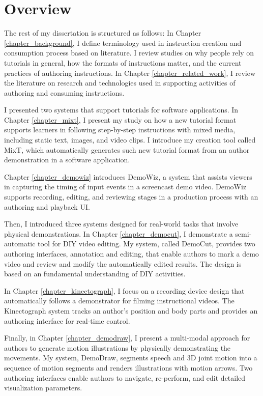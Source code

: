 
\section{Overview}

The rest of my dissertation is structured as follows:
%
In Chapter \ref{chapter_background}, I define terminology used in instruction creation and consumption process based on literature. I review studies on why people rely on tutorials in general, how the formats of instructions matter, and the current practices of authoring instructions.
%
In Chapter \ref{chapter_related_work}, I review the literature on research and technologies used in supporting activities of authoring and consuming instructions.

I presented two systems that support tutorials for software applications.
In Chapter \ref{chapter_mixt}, I present my study on how a new tutorial format supports learners in following step-by-step instructions with mixed media, including static text, images, and video clips. I introduce my creation tool called MixT, which automatically generates such new tutorial format from an author demonstration in a software application.

Chapter \ref{chapter_demowiz} introduces DemoWiz, a system that assists viewers in capturing the timing of input events in a screencast demo video. DemoWiz supports recording, editing, and reviewing stages in a production process with an authoring and playback UI.

Then, I introduced three systems designed for real-world tasks that involve physical demonstrations.
In Chapter \ref{chapter_democut}, I demonstrate a semi-automatic tool for DIY video editing. My system, called DemoCut, provides two authoring interfaces, annotation and editing, that enable authors to mark a demo video and review and modify the automatically edited results. The design is based on an fundamental understanding of DIY activities.

In Chapter \ref{chapter_kinectograph}, I focus on a recording device design that automatically follows a demonstrator for filming instructional videos. The Kinectograph system tracks an author's position and body parts and provides an authoring interface for real-time control.

Finally, in Chapter \ref{chapter_demodraw}, I present a multi-modal approach for authors to generate motion illustrations by physically demonstrating the movements. My system, DemoDraw, segments speech and 3D joint motion into a sequence of motion segments and renders illustrations with motion arrows. Two authoring interfaces enable authors to navigate, re-perform, and edit detailed visualization parameters.

